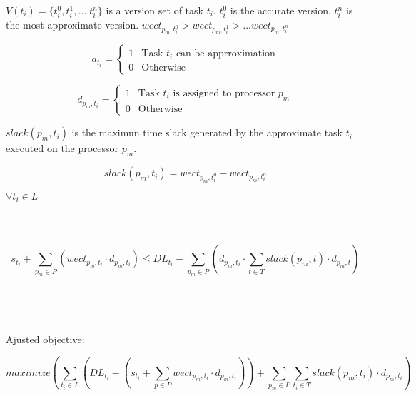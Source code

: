 \documentclass{article}
\begin{document}
$ V(t_i) = \{ t_i^0, t_i^1, .... t_i^n \} $ is a version set of task $t_i$. $t_i^0$ is the accurate version, $t_i^n$ is the most approximate version. $wect_{p_m, t_i^0} > wect_{p_m, t_i^1} > ... wect_{p_m, t_i^n}$


$$
a_{t_i} = 
\begin{cases}
1 & \text{Task $t_i$ can be apprroximation} \\
0 & \text{Otherwise}
\end{cases}
$$

$$
d_{p_m,t_i} = 
\begin{cases}
1 & \text{Task $t_i$ is assigned to processor $p_m$} \\
0 & \text{Otherwise}
\end{cases}
$$

$ slack(p_m, t_i) $ is the maximun time slack generated by the approximate task $t_i$ executed on the processor $ p_m $.

$$
slack(p_m, t_i) = wect_{p_m, t_i^0} - wect_{p_m, t_i^n}
$$


$ \forall t_i \in L $
\\
\\
\\
\\
$$
s_{t_i} + \sum_{p_m \in P} (wect_{p_m, t_i} \cdot d_{p_m, t_i}) \le
DL_{t_i} - \sum_{p_m \in P} ( d_{p_m, t_i} \cdot \sum_{t \in T} slack(p_m, t) \cdot d_{p_m, t})
$$
\\
\\
\\
\\
Ajusted objective:

$$
maximize( \sum_{t_i \in L} (DL_{t_i} - (s_{t_i} + \sum_{p \in P} wect_{p_m, t_i} \cdot d_{p_m, t_i})) + \sum_{p_m \in P} \sum_{t_i \in T} slack(p_m, t_i) \cdot d_{p_m, t_i})
$$







% 
% 
\end{document}
